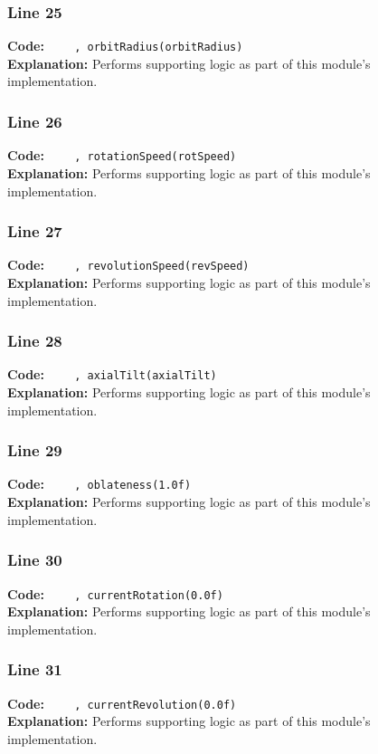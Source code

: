 \documentclass[11pt,a4paper]{article}
\begin{document}
\subsubsection*{Line 25}
\textbf{Code:} \verb|    , orbitRadius(orbitRadius)|\\
\textbf{Explanation:} Performs supporting logic as part of this module's implementation.

\subsubsection*{Line 26}
\textbf{Code:} \verb|    , rotationSpeed(rotSpeed)|\\
\textbf{Explanation:} Performs supporting logic as part of this module's implementation.

\subsubsection*{Line 27}
\textbf{Code:} \verb|    , revolutionSpeed(revSpeed)|\\
\textbf{Explanation:} Performs supporting logic as part of this module's implementation.

\subsubsection*{Line 28}
\textbf{Code:} \verb|    , axialTilt(axialTilt)|\\
\textbf{Explanation:} Performs supporting logic as part of this module's implementation.

\subsubsection*{Line 29}
\textbf{Code:} \verb|    , oblateness(1.0f)|\\
\textbf{Explanation:} Performs supporting logic as part of this module's implementation.

\subsubsection*{Line 30}
\textbf{Code:} \verb|    , currentRotation(0.0f)|\\
\textbf{Explanation:} Performs supporting logic as part of this module's implementation.

\subsubsection*{Line 31}
\textbf{Code:} \verb|    , currentRevolution(0.0f)|\\
\textbf{Explanation:} Performs supporting logic as part of this module's implementation.
\end{document}
